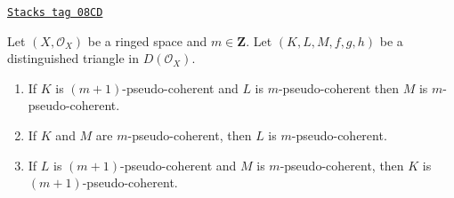 \begin{lemma}
\label{cohomology-lemma-cone-pseudo-coherent}
\href{https://stacks.math.columbia.edu/tag/08CD}{\texttt{Stacks tag 08CD}}

Let $(X, \mathcal{O}_X)$ be a ringed space and $m \in \mathbf{Z}$.
Let $(K, L, M, f, g, h)$ be a distinguished triangle in $D(\mathcal{O}_X)$.
\begin{enumerate}
\item If $K$ is $(m + 1)$-pseudo-coherent and $L$ is $m$-pseudo-coherent
then $M$ is $m$-pseudo-coherent.
\item If $K$ and $M$ are $m$-pseudo-coherent, then $L$ is $m$-pseudo-coherent.
\item If $L$ is $(m + 1)$-pseudo-coherent and $M$
is $m$-pseudo-coherent, then $K$ is $(m + 1)$-pseudo-coherent.
\end{enumerate}
\end{lemma}


